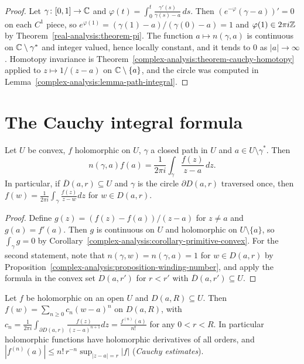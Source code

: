 \begin{proof}
Let $\gamma \colon [0, 1] \to \mathbb{C}$ and $\varphi(t) = \int_0^t\frac{\gamma'(s)}{\gamma(s) - a}\,ds$. Then $(e^{-\varphi}(\gamma - a))' = 0$ on each $C^1$ piece, so $e^{\varphi(1)} = (\gamma(1) - a)/(\gamma(0) - a) = 1$ and
$\varphi(1) \in 2\pi i\mathbb{Z}$ by Theorem~\ref{real-analysis:theorem-pi}. The function $a \mapsto n(\gamma, a)$ is continuous on $\mathbb{C} \setminus \gamma^*$ and integer valued, hence locally constant, and it tends
to $0$ as $|a| \to \infty$. Homotopy invariance is Theorem~\ref{complex-analysis:theorem-cauchy-homotopy} applied to $z \mapsto 1/(z - a)$ on $\mathbb{C} \setminus \{a\}$, and the circle was computed in
Lemma~\ref{complex-analysis:lemma-path-integral}.
\end{proof}

\section{The Cauchy integral formula}\label{complex-analysis:section-cauchy-formula}

\begin{theorem}\label{complex-analysis:theorem-cauchy-formula}
Let $U$ be convex, $f$ holomorphic on $U$, $\gamma$ a closed path in $U$ and $a \in U \setminus \gamma^*$. Then
\[
n(\gamma, a)f(a) = \frac{1}{2\pi i}\int_\gamma\frac{f(z)}{z - a}\,dz.
\]
In particular, if $\overline{D}(a, r) \subseteq U$ and $\gamma$ is the circle $\partial D(a, r)$ traversed once, then $f(w) = \frac{1}{2\pi i}\int_\gamma\frac{f(z)}{z - w}dz$ for $w \in D(a, r)$.
\end{theorem}

\begin{proof}
Define $g(z) = (f(z) - f(a))/(z - a)$ for $z \neq a$ and $g(a) = f'(a)$. Then $g$ is continuous on $U$ and holomorphic on $U \setminus \{a\}$, so $\int_\gamma g = 0$ by
Corollary~\ref{complex-analysis:corollary-primitive-convex}. For the second statement, note that $n(\gamma, w) = n(\gamma, a) = 1$ for $w \in D(a, r)$ by
Proposition~\ref{complex-analysis:proposition-winding-number}, and apply the formula in the convex set $D(a, r')$ for $r < r' $ with $\overline{D}(a, r') \subseteq U$.
\end{proof}

\begin{theorem}\label{complex-analysis:theorem-analytic}
Let $f$ be holomorphic on an open $U$ and $D(a, R) \subseteq U$. Then $f(w) = \sum_{n \geq 0}c_n(w - a)^n$ on $D(a, R)$, with
$c_n = \frac{1}{2\pi i}\int_{\partial D(a, r)}\frac{f(z)}{(z - a)^{n+1}}dz = \frac{f^{(n)}(a)}{n!}$ for any $0 < r < R$. In particular holomorphic functions have holomorphic derivatives of all orders, and
$|f^{(n)}(a)| \leq n!\,r^{-n}\sup_{|z - a| = r}|f|$ (\emph{Cauchy estimates}).
\end{theorem}

